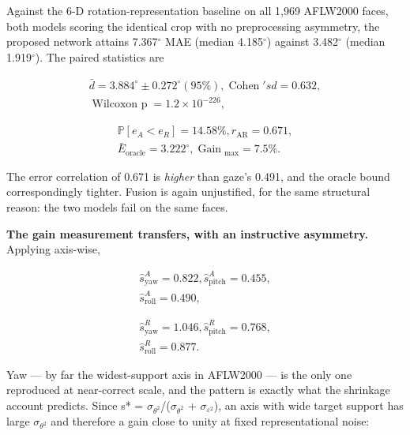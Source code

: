 Against the 6-D rotation-representation baseline on all 1,969 AFLW2000 faces, both models scoring the identical crop with no preprocessing asymmetry, the proposed network attains 7.367$^{\circ}$ MAE (median 4.185$^{\circ}$) against 3.482$^{\circ}$ (median 1.919$^{\circ}$). The paired statistics are

\begin{equation}
\label{eq:223}
\begin{aligned}
\bar{d} = 3.884^{\circ} \pm 0.272^{\circ} (95 \%) , \;\text{Cohen}\;'s d = 0.632 , \\
\;\text{Wilcoxon p}\; = 1.2 \times 10^{-226} ,
\end{aligned}
\end{equation}

\begin{equation}
\label{eq:224}
\begin{aligned}
\mathbb{P}[ e_A < e_R ] = 14.58 \% , r_{\mathrm{AR}} = 0.671 , \\
\bar{E}_{\mathrm{oracle}} = 3.222^{\circ} , \;\text{Gain}\;_{\mathrm{max}} = 7.5 \% .
\end{aligned}
\end{equation}

The error correlation of 0.671 is \emph{higher} than gaze's 0.491, and the oracle bound correspondingly tighter. Fusion is again unjustified, for the same structural reason: the two models fail on the same faces.

\textbf{The gain measurement transfers, with an instructive asymmetry.} Applying  axis-wise,

\begin{equation}
\label{eq:225}
\begin{aligned}
\hat{s}_{\mathrm{yaw}}^A = 0.822 , \hat{s}_{\mathrm{pitch}}^A = 0.455 , \\
\hat{s}_{\mathrm{roll}}^A = 0.490 ,
\end{aligned}
\end{equation}

\begin{equation}
\label{eq:226}
\begin{aligned}
\hat{s}_{\mathrm{yaw}}^R = 1.046 , \hat{s}_{\mathrm{pitch}}^R = 0.768 , \\
\hat{s}_{\mathrm{roll}}^R = 0.877 .
\end{aligned}
\end{equation}

Yaw --- by far the widest-support axis in AFLW2000 --- is the only one reproduced at near-correct scale, and the pattern is exactly what the shrinkage account  predicts. Since s* = $\sigma_{\theta^{2}}$/($\sigma_{\theta^{2}}$ + $\sigma_{\varepsilon^{2}}$), an axis with wide target support has large $\sigma_{\theta^{2}}$ and therefore a gain close to unity at fixed representational noise:

